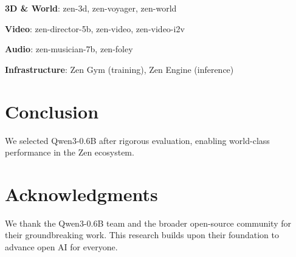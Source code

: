 \documentclass[11pt,a4paper]{article}
\begin{document}
\textbf{3D \& World}: zen-3d, zen-voyager, zen-world

\textbf{Video}: zen-director-5b, zen-video, zen-video-i2v

\textbf{Audio}: zen-musician-7b, zen-foley

\textbf{Infrastructure}: Zen Gym (training), Zen Engine (inference)

\section{Conclusion}
We selected Qwen3-0.6B after rigorous evaluation, enabling world-class performance in the Zen ecosystem.

\section*{Acknowledgments}
We thank the Qwen3-0.6B team and the broader open-source community for their groundbreaking work. This research builds upon their foundation to advance open AI for everyone.



\end{document}
